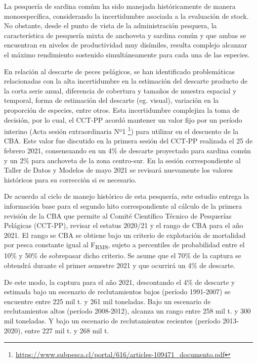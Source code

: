 \documentclass[
  spanish,
]{article}
\begin{document}
La pesquería de sardina comúm ha sido manejada históricamente de manera
monoespecífica, considerando la incertidumbre asociada a la evaluación
de stock. No obstante, desde el punto de vista de la administración
pesquera, la característica de pesquería mixta de anchoveta y sardina
común y que ambas se encuentran en niveles de productividad muy
disímiles, resulta complejo alcanzar el máximo rendimiento sostenido
simultáneamente para cada una de las especies.

En relación al descarte de peces pelágicos, se han identificado
problemáticas relacionadas con la alta incertidumbre en la estimación
del descarte producto de la corta serie anual, diferencia de cobertura y
tamaños de muestra espacial y temporal, forma de estimación del descarte
(eg. visual), variación en la proporción de especies, entre otros. Esta
incertidumbre complejiza la toma de decisión, por lo cual, el CCT-PP
acordó mantener un valor fijo por un período interino (Acta sesión
extraordinaria Nº1 \footnote{\url{https://www.subpesca.cl/portal/616/articles-109471_documento.pdf}})
para utilizar en el descuento de la CBA. Este valor fue discutido en la
primera sesión del CCT-PP realizada el 25 de febrero 2021, consensuando
en un 4\% de descarte proyectado para sardina común y un 2\% para
anchoveta de la zona centro-sur. En la sesión correspondiente al Taller
de Datos y Modelos de mayo 2021 se revisará nuevamente los valores
históricos para su corrección si es necesario.

De acuerdo al ciclo de manejo histórico de esta pesquería, este estudio
entrega la información base para el segundo hito correspondiente al
cálculo de la primera revisión de la CBA que permite al Comité
Científico Técnico de Pesquerías Pelágicas (CCT-PP), revisar el estatus
2020/21 y el rango de CBA para el año 2021. El rango se CBA se obtiene
bajo un criterio de explotación de mortalidad por pesca constante igual
al F\textsubscript{RMS}, sujeto a percentiles de probabilidad entre el
10\% y 50\% de sobrepasar dicho criterio. Se asume que el 70\% de la
captura se obtendrá durante el primer semestre 2021 y que ocurrirá un
4\% de descarte.

De este modo, la captura para el año 2021, descontando el 4\% de
descarte y estimada bajo un escenario de reclutamientos bajos (período
1991-2007) se encuentre entre 225 mil t. y 261 mil toneladas. Bajo un
escenario de reclutamientos altos (período 2008-2012), alcanza un rango
entre 258 mil t. y 300 mil toneladas. Y bajo un escenario de
reclutamientos recientes (período 2013-2020), entre 227 mil t. y 268 mil
t.
\end{document}
